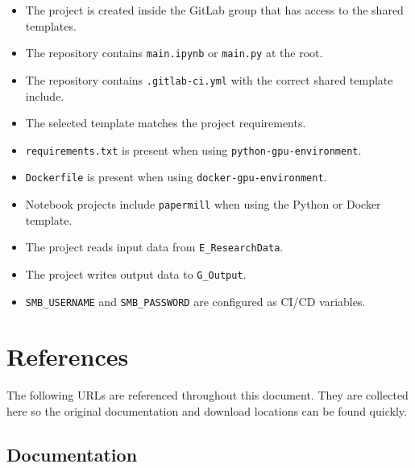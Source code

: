 \documentclass{article}
\begin{document}
\begin{itemize}
	\item The project is created inside the GitLab group that has access to the shared templates.
	\item The repository contains \texttt{main.ipynb} or \texttt{main.py} at the root.
	\item The repository contains \texttt{.gitlab-ci.yml} with the correct shared template include.
	\item The selected template matches the project requirements.
	\item \texttt{requirements.txt} is present when using \texttt{python-gpu-environment}.
	\item \texttt{Dockerfile} is present when using \texttt{docker-gpu-environment}.
	\item Notebook projects include \texttt{papermill} when using the Python or Docker template.
	\item The project reads input data from \texttt{E\_ResearchData}.
	\item The project writes output data to \texttt{G\_Output}.
	\item \texttt{SMB\_USERNAME} and \texttt{SMB\_PASSWORD} are configured as CI/CD variables.
\end{itemize}

\newpage
\section{References}

The following URLs are referenced throughout this document. They are collected here so the original documentation and download locations can be found quickly.

\subsection{Documentation}
\end{document}
